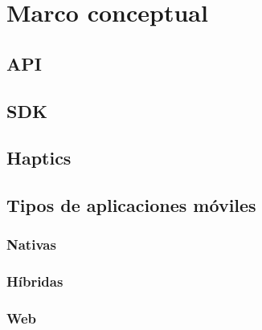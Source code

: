 \section{Marco conceptual}

\subsection{API}

\subsection{SDK}

\subsection{Haptics}

\subsection{Tipos de aplicaciones móviles}



	\subsubsection{Nativas}
	
	\subsubsection{Híbridas}
	
	\subsubsection{Web}



